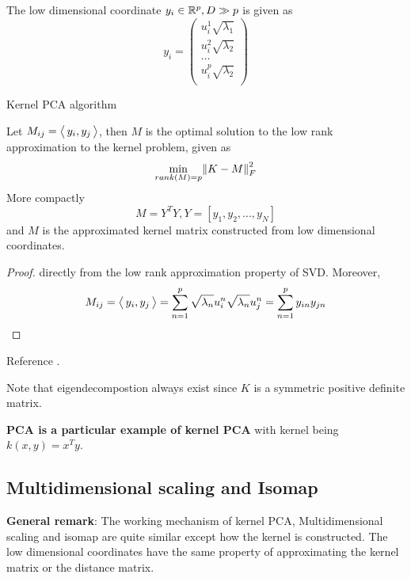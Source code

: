 \begin{refsection}
\begin{algorithm}[H]
 The low dimensional coordinate $y_i \in \mathbb{R}^p, D\gg p$ is given as
 $$y_i=\begin{pmatrix}
        u^1_{i}\sqrt{\lambda_1}\\
        u^2_{i}\sqrt{\lambda_2}\\
        \dots\\
        u^p_{i}\sqrt{\lambda_2}\\
 \end{pmatrix}
 $$
 
 \caption{Kernel PCA algorithm}
\end{algorithm}


\begin{lemma}
Let $M_{ij} = {\left< \, y_i,y_j \, \right>}$, then $M$ is the optimal solution to the low rank approximation to the kernel problem, given as
$$\min_{rank(M)=p} \norm{K-M}_F^2$$
More compactly
$$M = Y^TY,Y=[y_1,y_2,...,y_N]$$ and $M$ is the approximated kernel matrix constructed from low dimensional coordinates.
\end{lemma}
\begin{proof}
directly from the low rank approximation property of SVD. Moreover, 
$$M_{ij} = {\left< \, y_i,y_j \, \right>} = \sum_{n=1}^p \sqrt{\lambda_n}u^n_i \sqrt{\lambda_n} u^n_j =\sum_{n=1}^p y_{in}y_{jn}$$
\end{proof}

\begin{remark}
Reference \cite[132]{vidal2016generalized}.
\end{remark}

\begin{remark}
Note that eigendecompostion always exist since $K$ is a symmetric positive definite matrix. 
\end{remark}



\begin{remark}
\textbf{PCA is a particular example of kernel PCA} with kernel being $k(x,y)=x^Ty$.
\end{remark}




\subsection{Multidimensional scaling and Isomap}
\begin{mdframed}
\textbf{General remark}:
The working mechanism of kernel PCA, Multidimensional scaling and isomap are quite similar except how the kernel is constructed. The low dimensional coordinates have the same property of approximating the kernel matrix or the distance matrix. 
\end{mdframed}



\end{refsection}

